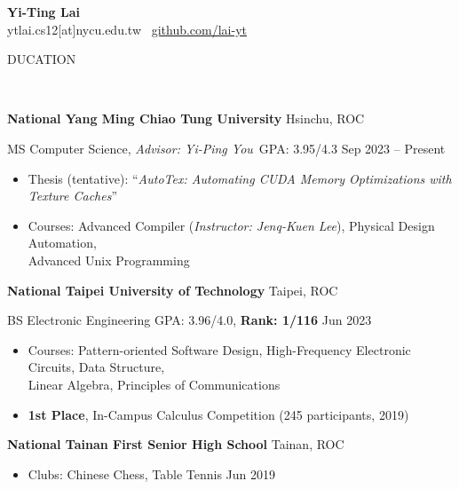 \documentclass[11pt]{article}
\begin{document}
\begin{center}
    \textbf{\Large Yi-Ting Lai}\\
    ytlai.cs12[at]nycu.edu.tw \textbullet \ \href{https://github.com/lai-yt}{github.com/lai-yt}
\end{center}

\vspace{0.5pt}

\begin{center}
    \scalebox{1.3}{E}DUCATION\raggedright \,\hrulefill
\end{center}

\textbf{National Yang Ming Chiao Tung University} \hfill Hsinchu, ROC

MS Computer Science, \textit{Advisor: Yi-Ping You} \,\qquad GPA: 3.95/4.3 \hfill Sep 2023 -- Present

\begin{itemize}[noitemsep, topsep=0pt, partopsep=0pt, parsep=0pt, leftmargin=*]
    \item Thesis (tentative): ``\textit{AutoTex: Automating CUDA Memory Optimizations with Texture Caches}''
    \item Courses: Advanced Compiler (\textit{Instructor: Jenq-Kuen Lee}), Physical Design Automation,\\Advanced Unix Programming
\end{itemize}

\vspace{6pt}

\textbf{National Taipei University of Technology} \hfill Taipei, ROC

BS Electronic Engineering \enskip \qquad \qquad \qquad \qquad \qquad GPA: 3.96/4.0, \textbf{Rank: 1/116} \hfill Jun 2023
\begin{itemize}[noitemsep, topsep=0pt, partopsep=0pt, parsep=0pt, leftmargin=*]
    \item Courses: Pattern-oriented Software Design, High-Frequency Electronic Circuits, Data Structure,\\Linear Algebra, Principles of Communications
    \item \textbf{1st Place}, In-Campus Calculus Competition (245 participants, 2019)
\end{itemize}

\vspace{6pt}

\textbf{National Tainan First Senior High School} \hfill    Tainan, ROC

\begin{itemize}[noitemsep, topsep=0pt, partopsep=0pt, parsep=0pt, leftmargin=*]
    \item Clubs: Chinese Chess, Table Tennis \hfill Jun 2019
\end{itemize}
\end{document}
